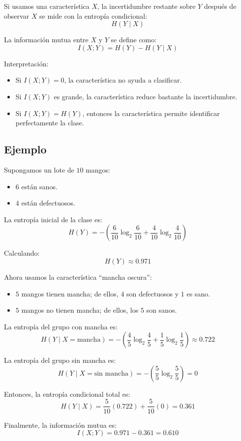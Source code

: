 \documentclass[12pt]{article}
\begin{document}
Si usamos una característica \(X\), la incertidumbre restante sobre \(Y\) después de observar \(X\) se mide con la entropía condicional:
\[
H(Y \mid X)
\]

La información mutua entre \(X\) y \(Y\) se define como:
\[
I(X;Y) = H(Y) - H(Y \mid X)
\]

Interpretación:
\begin{itemize}
    \item Si \(I(X;Y) = 0\), la característica no ayuda a clasificar.
    \item Si \(I(X;Y)\) es grande, la característica reduce bastante la incertidumbre.
    \item Si \(I(X;Y) = H(Y)\), entonces la característica permite identificar perfectamente la clase.
\end{itemize}

\subsection{Ejemplo}
Supongamos un lote de \(10\) mangos:
\begin{itemize}
    \item \(6\) están sanos.
    \item \(4\) están defectuosos.
\end{itemize}

La entropía inicial de la clase es:
\[
H(Y) = -\left(\frac{6}{10}\log_2\frac{6}{10} + \frac{4}{10}\log_2\frac{4}{10}\right)
\]

Calculando:
\[
H(Y) \approx 0.971
\]

Ahora usamos la característica ``mancha oscura'':
\begin{itemize}
    \item \(5\) mangos tienen mancha; de ellos, \(4\) son defectuosos y \(1\) es sano.
    \item \(5\) mangos no tienen mancha; de ellos, los \(5\) son sanos.
\end{itemize}

La entropía del grupo con mancha es:
\[
H(Y \mid X=\text{mancha}) =
-\left(\frac{4}{5}\log_2\frac{4}{5} + \frac{1}{5}\log_2\frac{1}{5}\right)
\approx 0.722
\]

La entropía del grupo sin mancha es:
\[
H(Y \mid X=\text{sin mancha}) =
-\left(\frac{5}{5}\log_2\frac{5}{5}\right) = 0
\]

Entonces, la entropía condicional total es:
\[
H(Y \mid X) = \frac{5}{10}(0.722) + \frac{5}{10}(0) = 0.361
\]

Finalmente, la información mutua es:
\[
I(X;Y) = 0.971 - 0.361 = 0.610
\]
\end{document}
